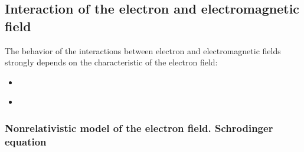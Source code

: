 \documentclass[letterpaper,10pt,english]{jupyterBook}
\begin{document}
\subsection{Interaction of the electron and electromagnetic field}
\label{\detokenize{ch/quantum-mechanics/qft/interactions-e-em-fields:interaction-of-the-electron-and-electromagnetic-field}}\label{\detokenize{ch/quantum-mechanics/qft/interactions-e-em-fields:quantum-mechanics-qft-interactions-e-em-fields}}\label{\detokenize{ch/quantum-mechanics/qft/interactions-e-em-fields::doc}}
\sphinxAtStartPar
The behavior of the interactions between electron and electromagnetic fields strongly depends on the characteristic of the electron field:
\begin{itemize}
\item {} 
\sphinxAtStartPar
{\hyperref[\detokenize{ch/quantum-mechanics/qft/interactions-e-em-fields-atom-spectrum:quantum-mechanics-qft-interactions-e-em-fields-atom-spectra}]{}}

\item {} 
\sphinxAtStartPar
{\hyperref[\detokenize{ch/quantum-mechanics/qft/interactions-e-em-fields-compton:quantum-mechanics-qft-interactions-e-em-fields-compton-scattering}]{}}

\end{itemize}
\subsubsection*{Non\sphinxhyphen{}relativistic model of the electron field. Schrodinger equation}
\end{document}
